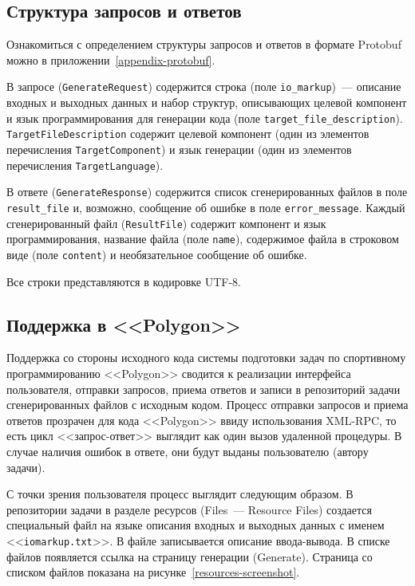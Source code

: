 \documentclass[times,specification,annotation]{style/itmo-student-thesis/itmo-student-thesis}
\begin{document}
\subsection{Структура запросов и ответов}

Ознакомиться с определением структуры запросов и ответов в формате Protobuf можно в приложении~\ref{appendix-protobuf}.

В запросе (\texttt{GenerateRequest}) содержится строка (поле \texttt{io\_markup})~--- описание входных и выходных данных и набор структур, описывающих целевой компонент и язык программирования для генерации кода (поле \texttt{target\_file\_description}). \texttt{TargetFileDescription} содержит целевой компонент (один из элементов перечисления \texttt{TargetComponent}) и язык генерации (один из элементов перечисления \texttt{TargetLanguage}).

В ответе (\texttt{GenerateResponse}) содержится список сгенерированных файлов в поле \texttt{result\_file} и, возможно, сообщение об ошибке в поле \texttt{error\_message}. Каждый сгенерированный файл (\texttt{ResultFile}) содержит компонент и язык программирования, название файла (поле \texttt{name}), содержимое файла в строковом виде (поле \texttt{content}) и необязательное сообщение об ошибке.

Все строки представляются в кодировке UTF-8.

\subsection{Поддержка в <<Polygon>>}

Поддержка со стороны исходного кода системы подготовки задач по спортивному программированию <<Polygon>> сводится к реализации интерфейса пользователя, отправки запросов, приема ответов и записи в репозиторий задачи сгенерированных файлов с исходным кодом. Процесс отправки запросов и приема ответов прозрачен для кода <<Polygon>> ввиду использования XML-RPC, то есть цикл <<запрос-ответ>> выглядит как один вызов удаленной процедуры. В случае наличия ошибок в ответе, они будут выданы пользователю (автору задачи).

С точки зрения пользователя процесс выглядит следующим образом. В репозитории задачи в разделе ресурсов (Files~--- Resource Files) создается специальный файл на языке описания входных и выходных данных с именем <<\texttt{iomarkup.txt}>>. В файле записывается описание ввода-вывода. В списке файлов появляется ссылка на страницу генерации (Generate). Страница со списком файлов показана на рисунке~\ref{resources-screenshot}.
\end{document}
